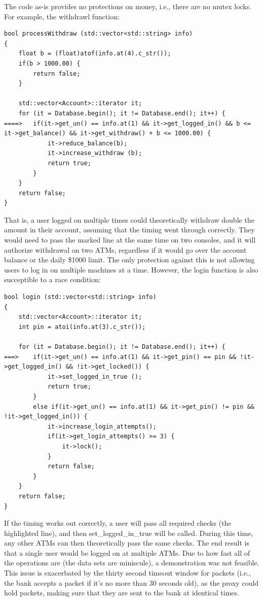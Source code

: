 \documentclass{article}
\begin{document}
The code as-is provides no protections on money, i.e., there are no mutex locks. For example, the withdrawl function:
\begin{lstlisting}
bool processWithdraw (std::vector<std::string> info)
{
	float b = (float)atof(info.at(4).c_str());
	if(b > 1000.00) {
		return false;
	}

	std::vector<Account>::iterator it;
	for (it = Database.begin(); it != Database.end(); it++) {
====>	if(it->get_un() == info.at(1) && it->get_logged_in() && b <= it->get_balance() && it->get_withdraw() + b <= 1000.00) {
			it->reduce_balance(b);
			it->increase_withdraw (b);
			return true;
		}
	}
	return false;
}
\end{lstlisting}
That is, a user logged on multiple times could theoretically withdraw double the amount in their account, assuming that the timing went through correctly. They would need to pass the marked line at the same time on two consoles, and it will authorize withdrawal on two ATMs, regardless if it would go over the account balance or the daily \$1000 limit. The only protection against this is not allowing users to log in on multiple machines at a time. However, the login function is also succeptible to a race condition:
\begin{lstlisting}
bool login (std::vector<std::string> info) 
{
	std::vector<Account>::iterator it;
	int pin = atoi(info.at(3).c_str());

	for (it = Database.begin(); it != Database.end(); it++) {
===>	if(it->get_un() == info.at(1) && it->get_pin() == pin && !it->get_logged_in() && !it->get_locked()) {
			it->set_logged_in_true ();
			return true;
		} 
		else if(it->get_un() == info.at(1) && it->get_pin() != pin && !it->get_logged_in()) {
			it->increase_login_attempts();
			if(it->get_login_attempts() >= 3) {
				it->lock();
			}
			return false;
		}
	}
	return false;
}
\end{lstlisting}
If the timing works out correctly, a user will pass all required checks (the highlighted line), and then set\_logged\_in\_true will be called. During this time, any other ATMs can then theoretically pass the same checks. The end result is that a single user would be logged on at multiple ATMs. Due to how fast all of the operations are (the data sets are miniscule), a demonstration was not feasible. This issue is exacerbated by the thirty second timeout window for packets (i.e., the bank accepts a packet if it's no more than 30 seconds old), as the proxy could hold packets, making sure that they are sent to the bank at identical times.
\end{document}
